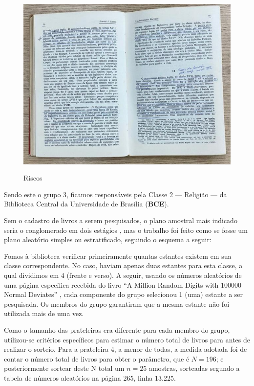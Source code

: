 \documentclass[a4paper, 12pt]{article}
\begin{document}
\begin{figure}[H]
    \centering
    \caption{Riscos}
    \includegraphics[scale=.7]{figura3.png}
        \label{figura3}
\end{figure}

Sendo este o grupo 3, ficamos responsáveis pela Classe 2  —  Religião  —  da Biblioteca Central da Universidade de Brasília (\textbf{BCE}).

Sem o cadastro de livros a serem pesquisados, o plano amostral mais indicado seria o conglomerado em dois estágios \cite{cochran1977sampling}, mas o trabalho foi feito como se fosse um plano aleatório simples ou estratificado, seguindo o esquema a seguir: 

Fomos à biblioteca verificar primeiramente quantas estantes existem em sua classe correspondente. No caso, haviam apenas duas estantes para esta classe, a qual dividimos em 4 (frente e verso). A seguir, usando os números aleatórios de uma página específica recebida do livro “A Million Random Digits with 100000 Normal Deviates” \cite{rand1955million}, cada componente do grupo selecionou 1 (uma) estante a ser pesquisada. Os membros do grupo  garantiram que a mesma estante não foi utilizada mais de uma vez. 

Como o tamanho das prateleiras era diferente para cada membro do grupo, utilizou-se critérios específicos para estimar o número total de livros para antes de realizar o sorteio. Para a prateleira 4, a menor de todas, a medida adotada foi de contar o número total de livros para obter o parâmetro, que é $N = 196$; e posteriormente sortear deste N total um $n=25$ amostras, sorteadas segundo a tabela de números aleatórios \cite{rand1955million} na página 265, linha 13.225. %
\end{document}
